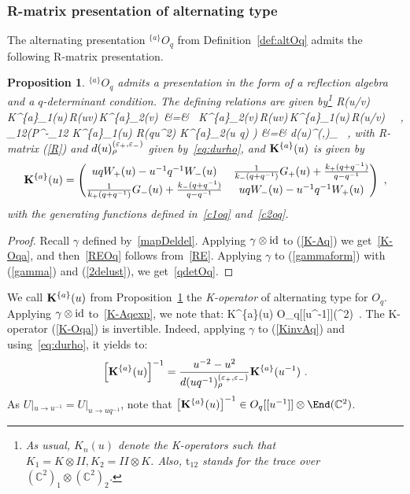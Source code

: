 \documentclass[11pt]{amsart}
\numberwithin{equation}{section}
\newtheorem{prop}[thm]{Proposition}
\numberwithin{equation}{section}
\begin{document}
\subsubsection{R-matrix presentation of alternating type}
The alternating presentation $^{\{a\}}O_q$  from Definition~\ref{def:altOq} admits the following  R-matrix presentation.
	\begin{prop}\label{prop:FRTalt} $^{\{a\}}O_q$ admits a presentation in the form of a reflection algebra and a $q$-determinant condition.
 The defining relations are given by\footnote{As usual, $K_{n}(u)$
denote the K-operators such that $K_{1} = K\otimes I\!\!I, K_{2}= I\!\!I \otimes K$. Also, $\text{t}_{12}$ stands for the trace over $({\mathbb C}^2)_1\otimes ({\mathbb C}^2)_2$.}
	\beqa 
		R(u/v)\,{\bold K}^{\{a\}}_1(u)\,R(uv)\,{\bold K}^{\{a\}}_2(v)\
		&=& \ {\bold K}^{\{a\}}_2(v)\,R(uv)\,{\bold K}^{\{a\}}_1(u)\,R(u/v)\ 
		\label{REOq} \ ,\\
		\normalfont{\text{tr}}_{12}\big({\cal P}^{-}_{12} {\bold K}^{\{a\}}_1(u)  R(qu^2)  {\bold K}^{\{a\}}_2(u q) \big) &=&  d(u)^{(\epsp,\epsm)}_{\rho} \label{qdetOq} \ ,
	\eeqa
with R-matrix (\ref{R}) and $d(u)^{(\varepsilon_+,\varepsilon_-)}_{\rho}$ given by~\eqref{eq:durho}, and ${\bold K}^{\{a\}}(u)$ 
is given by 
	\begin{equation}
		{\bold K}^{\{a\}}(u)=\begin{pmatrix} 
			uq W_+(u)-u^{-1}q^{-1}W_-(u) &\frac{1}{k_-(q+q^{-1})}G_+(u)+\frac{k_+(q+q^{-1})}{q-q^{-1}} \\ 
			\frac{1}{k_+(q+q^{-1})}G_-(u) +\frac{k_-(q+q^{-1})}{q-q^{-1}}& uq W_-(u) -u^{-1}q^{-1}W_+(u) 
		\end{pmatrix}  \label{K-Oqa} \ ,
	\end{equation}
with the generating functions defined in~\eqref{c1oq} and~\eqref{c2oq}.
\end{prop}
\begin{proof} Recall $\gamma$ defined by~\eqref{mapDeldel}. Applying $\gamma\otimes \mathrm{id}$ to (\ref{K-Aq}) we  get~\eqref{K-Oqa}, and then~\eqref{REOq} follows from~\eqref{RE}. Applying $\gamma$ to (\ref{gammaform}) with (\ref{gamma}) and (\ref{2delust}), we  get~\eqref{qdetOq}.
	\end{proof}
We call ${\bold K}^{\{a\}}(u)$ from Proposition~\ref{prop:FRTalt}  the {\it K-operator} of alternating type for $O_q$.
 Applying $\gamma \otimes \mathrm{id}$ to~\eqref{K-Aqexp}, we note that:
	\beqa\label{Ka-form}
	{\bold K}^{\{a\}}(u) \in O_q[[u^{-1}]]\otimes \End(\mathbb{C}^2)\ .
	\eeqa 
The K-operator (\ref{K-Oqa}) is invertible. Indeed, applying $\gamma$ to (\ref{KinvAq}) and using~\eqref{eq:durho}, it yields to:
\begin{equation}
	\left [	{\bold K}^{\{a\}}(u) \right ]^{-1} = \frac{u^{-2}-u^{2}}{d(uq^{-1})^{(\varepsilon_+,\varepsilon_-)}_{\rho}}{\bold K}^{\{a\}}(u^{-1}) 
	\ .\label{KinvOqa}
\end{equation}
As $U|_{u\rightarrow u^{-1}}= U|_{u\rightarrow uq^{-1}}$, note that	$\left [	{\bold K}^{\{a\}}(u) \right ]^{-1}\in O_q[[u^{-1}]]\otimes \End(\mathbb{C}^2)$.
\end{document}
